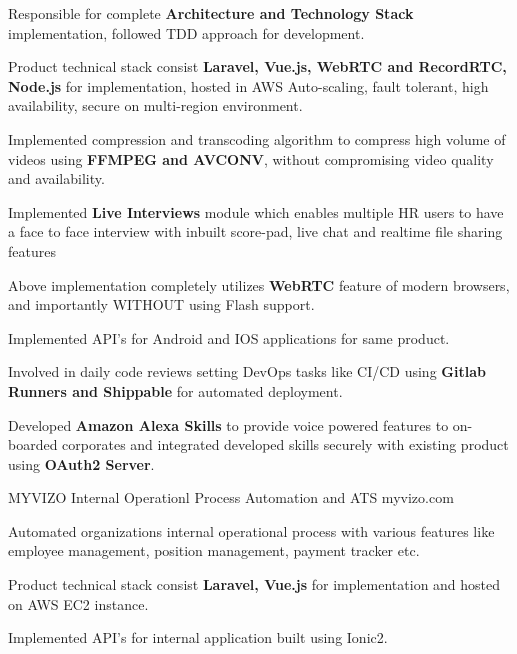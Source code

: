 \begin{cventries}
{\begin{cvitems}
        \item {Responsible for complete \textbf{Architecture and Technology Stack} implementation, followed TDD approach for development.}
        \item {Product technical stack consist \textbf{Laravel, Vue.js, WebRTC and RecordRTC, Node.js} for implementation, hosted in AWS Auto-scaling, fault tolerant, high availability, secure on multi-region environment.}
        \item {Implemented compression and transcoding algorithm to compress high volume of videos using \textbf{FFMPEG and AVCONV}, without compromising video quality and availability.}
        \item {Implemented \textbf{Live Interviews} module which enables multiple HR users to have a face to face interview with inbuilt score-pad, live chat and realtime file sharing features}
        \item {Above implementation completely utilizes \textbf{WebRTC} feature of modern browsers, and importantly WITHOUT using Flash support.}
        \item {Implemented API's for Android and IOS applications for same product.}
        \item {Involved in daily code reviews setting DevOps tasks like CI/CD using \textbf{Gitlab Runners and Shippable} for automated deployment.}
        \item {Developed \textbf{Amazon Alexa Skills} to provide voice powered features to on-boarded corporates and integrated developed skills securely with existing product using \textbf{OAuth2 Server}. }
        \\
      \end{cvitems}
    }
    \cventry
    {MYVIZO} %
    {Internal Operationl Process Automation and ATS} %
    {myvizo.com} %
    { } %
    {
      \begin{cvitems} %
        \item {Automated organizations internal operational process with various features like employee management, position management, payment tracker etc.}
        \item {Product technical stack consist \textbf{Laravel, Vue.js} for implementation and hosted on AWS EC2 instance.}
        \item {Implemented API's for internal application built using Ionic2.}

\end{cvitems}}
\end{cventries}
